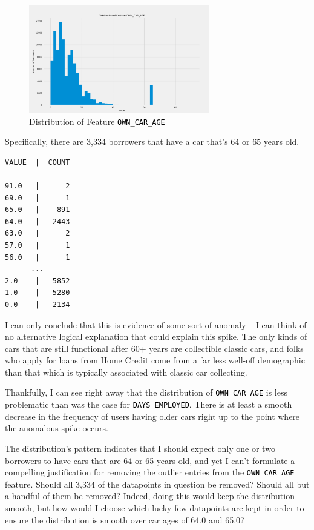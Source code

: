 \documentclass[12pt, letterpaper]{article}
\begin{document}
\begin{figure}[ht]
\includegraphics[width=0.7\textwidth]{distribOWNCARAGE}
\centering
\caption{Distribution of Feature \colorbox{backcolor}{\textcolor{black}{\texttt{OWN_CAR_AGE}}}}
\end{figure}

Specifically, there are 3,334 borrowers that have a car that's 64 or 65 years old.

\begin{lstlisting}
VALUE  |  COUNT
----------------
91.0   |      2
69.0   |      1
65.0   |    891
64.0   |   2443
63.0   |      2
57.0   |      1
56.0   |      1
      ...
2.0    |   5852
1.0    |   5280
0.0    |   2134
\end{lstlisting}

I can only conclude that this is evidence of some sort of anomaly -- I can think of no alternative logical explanation that could explain this spike. The only kinds of cars that are still functional after 60+ years are collectible classic cars, and folks who apply for loans from Home Credit come from a far less well-off demographic than that which is typically associated with classic car collecting.

Thankfully, I can see right away that the distribution of \colorbox{backcolor}{\textcolor{black}{\texttt{OWN_CAR_AGE}}} is less problematic than was the case for \colorbox{backcolor}{\textcolor{black}{\texttt{DAYS_EMPLOYED}}}. There is at least a smooth decrease in the frequency of users having older cars right up to the point where the anomalous spike occurs.

The distribution's pattern indicates that I should expect only one or two borrowers to have cars that are 64 or 65 years old, and yet I can't formulate a compelling justification for removing the outlier entries from the \colorbox{backcolor}{\textcolor{black}{\texttt{OWN_CAR_AGE}}} feature. Should all 3,334 of the datapoints in question be removed? Should all but a handful of them be removed? Indeed, doing this would keep the distribution smooth, but how would I choose which lucky few datapoints are kept in order to ensure the distribution is smooth over car ages of 64.0 and 65.0?
\end{document}
